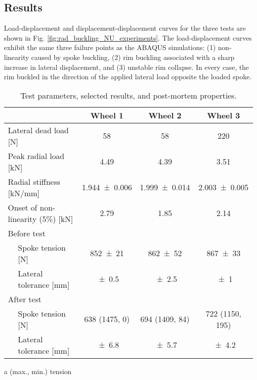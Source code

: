 \documentclass[\rootdir/thesis.tex]{subfiles}
\begin{document}
\subsection{Results}

Load-displacement and displacement-displacement curves for the three tests are shown in Fig. \ref{fig:rad_buckling_NU_experiments}. The load-displacement curves exhibit the same three failure points as the ABAQUS simulations: (1) non-linearity caused by spoke buckling, (2) rim buckling associated with a sharp increase in lateral displacement, and (3) unstable rim collapse. In every case, the rim buckled in the direction of the applied lateral load opposite the loaded spoke.

\begin{table}
\caption[Radial buckling experimental results]{Test parameters, selected results, and post-mortem properties.}
\label{tab:rad_buckling_tests}
\begin{threeparttable}
\begin{tabular}{llccc}
\toprule
&& \bf Wheel 1 & \bf Wheel 2 & \bf Wheel 3\\
\midrule
\multicolumn{2}{l}{Lateral dead load [\si{N}]} & \num{58} & \num{58} & \num{220}\\
\multicolumn{2}{l}{Peak radial load [\si{kN}]} & \num{4.49} & \num{4.39} & \num{3.51}\\
\multicolumn{2}{l}{Radial stiffness [\si{kN/mm}]} & \num{1.944+-0.006} & \num{1.999+-0.014} & \num{2.003+-0.005}\\
\multicolumn{2}{l}{Onset of non-linearity (5\%) [\si{kN}]} & \num{2.79} & \num{1.85} & \num{2.14}\\
\multicolumn{5}{l}{Before test}\\
\,& Spoke tension [\si{N}]      & \num{852+-21} & \num{862+-52} & \num{867+-33}\\
\,& Lateral tolerance [\si{mm}] & \num{+-0.5} & \num{+-2.5} & \num{+-1}\\

\multicolumn{5}{l}{After test}\\
\,& Spoke tension [\si{N}]      & 638 (1475, 0)\tnote{a} & 694 (1409, 84) & 722 (1150, 195)\\
\,& Lateral tolerance [\si{mm}] & \num{+-6.8} & \num{+-5.7} & \num{+-4.2}\\
\bottomrule
\end{tabular}
\begin{tablenotes}
\small
\item [a] (max., min.) tension
\end{tablenotes}
\end{threeparttable}
\end{table}
\end{document}
